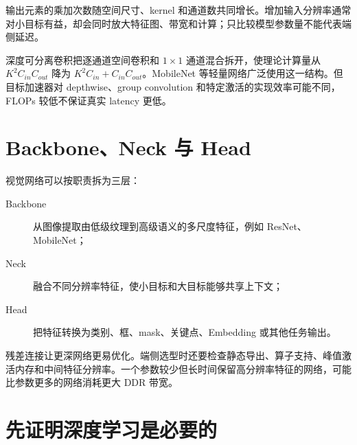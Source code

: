 输出元素的乘加次数随空间尺寸、kernel 和通道数共同增长。增加输入分辨率通常对小目标有益，却会同时放大特征图、带宽和计算；只比较模型参数量不能代表端侧延迟。

深度可分离卷积把逐通道空间卷积和 $1\times1$ 通道混合拆开，使理论计算量从 $K^2C_{in}C_{out}$ 降为 $K^2C_{in}+C_{in}C_{out}$。MobileNet 等轻量网络广泛使用这一结构\cite{mobilenetv2,mobilenetv3}。但目标加速器对 depthwise、group convolution 和特定激活的实现效率可能不同，FLOPs 较低不保证真实 latency 更低。

\section{Backbone、Neck 与 Head}

视觉网络可以按职责拆为三层：

\begin{description}
  \item[Backbone] 从图像提取由低级纹理到高级语义的多尺度特征，例如 ResNet、MobileNet；
  \item[Neck] 融合不同分辨率特征，使小目标和大目标能够共享上下文；
  \item[Head] 把特征转换为类别、框、mask、关键点、Embedding 或其他任务输出。
\end{description}

残差连接让更深网络更易优化\cite{resnet}。端侧选型时还要检查静态导出、算子支持、峰值激活内存和中间特征分辨率。一个参数较少但长时间保留高分辨率特征的网络，可能比参数更多的网络消耗更大 DDR 带宽。

\begin{center}
\end{center}

\section{先证明深度学习是必要的}

